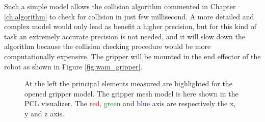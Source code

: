 Such a simple model allows the collision algorithm commented in Chapter \ref{ch:algorithm} to check for collision in just few millisecond. 
A more detailed and complex model would only lead as benefit a higher precision, but for this kind of task an extremely accurate precision is not needed, and it will slow down the algorithm because the collision checking procedure would be more computationally expensive. 
The gripper will be mounted in the end effector of the robot as shown in Figure \ref{fig:wam_gripper}. 


\begin{figure}[htp]
\centering
\begin{subfigure}[t]{0.25\textwidth}
\centering
{}
\end{subfigure} 
\begin{subfigure}[t]{0.3\textwidth}
\centering
{}
\end{subfigure}
\hspace{1cm}
\begin{subfigure}[t]{0.3\textwidth}
\centering
{}
\end{subfigure}
\caption{At the left the principal elements measured are highlighted for the opened gripper model. The gripper mesh model is here shown in the PCL visualizer. The \textcolor{red}{red}, \textcolor{green}{green} and \textcolor{blue}{blue} axis are respectively the x, y and z axis. }\label{fig:gripper_modelling}
\end{figure}

